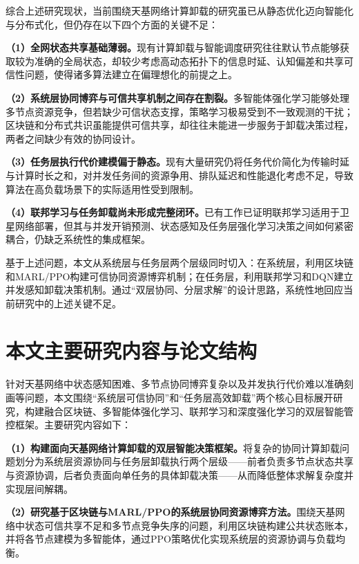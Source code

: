 综合上述研究现状，当前围绕天基网络计算卸载的研究虽已从静态优化迈向智能化与分布式化，但仍存在以下四个方面的关键不足：

\textbf{（1）全网状态共享基础薄弱。}现有计算卸载与智能调度研究往往默认节点能够获取较为准确的全局状态，却较少考虑高动态拓扑下的信息时延、认知偏差和共享可信性问题，使得诸多算法建立在偏理想化的前提之上。

\textbf{（2）系统层协同博弈与可信共享机制之间存在割裂。}多智能体强化学习能够处理多节点资源竞争，但若缺少可信状态支撑，策略学习极易受到不一致观测的干扰；区块链和分布式共识虽能提供可信共享，却往往未能进一步服务于卸载决策过程，两者之间缺少有效的协同设计。

\textbf{（3）任务层执行代价建模偏于静态。}现有大量研究仍将任务代价简化为传输时延与计算时长之和，对并发任务间的资源争用、排队延迟和性能退化考虑不足，导致算法在高负载场景下的实际适用性受到限制。

\textbf{（4）联邦学习与任务卸载尚未形成完整闭环。}已有工作已证明联邦学习适用于卫星网络部署，但其与并发开销预测、状态感知及任务层强化学习决策之间如何紧密耦合，仍缺乏系统性的集成框架。

基于上述问题，本文从系统层与任务层两个层级同时切入：在系统层，利用区块链和MARL/PPO构建可信协同资源博弈机制；在任务层，利用联邦学习和DQN建立并发感知卸载决策机制。通过“双层协同、分层求解”的设计思路，系统性地回应当前研究中的上述关键不足。


\section{本文主要研究内容与论文结构}

针对天基网络中状态感知困难、多节点协同博弈复杂以及并发执行代价难以准确刻画等问题，本文围绕“系统层可信协同”和“任务层高效卸载”两个核心目标展开研究，构建融合区块链、多智能体强化学习、联邦学习和深度强化学习的双层智能管控框架。主要研究内容如下：

\textbf{（1）构建面向天基网络计算卸载的双层智能决策框架。}将复杂的协同计算卸载问题划分为系统层资源协同与任务层卸载执行两个层级——前者负责多节点状态共享与资源协调，后者负责面向单任务的具体卸载决策——从而降低整体求解复杂度并实现层间解耦。

\textbf{（2）研究基于区块链与MARL/PPO的系统层协同资源博弈方法。}围绕天基网络中状态可信共享不足和多节点竞争失序的问题，利用区块链构建公共状态账本，并将各节点建模为多智能体，通过PPO策略优化实现系统层的资源协调与负载均衡。

